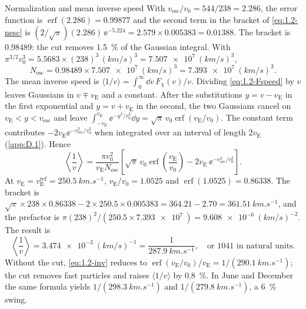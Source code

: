 \begin{workedexample}{Normalization and mean inverse speed}\label{we:1-nesc}
With $v_{\mathrm{esc}}/v_0 = 544/238 = 2.286$, the error function is $\operatorname{erf}(2.286) = 0.99877$ and the second term in the bracket of \cref{eq:1.2-nesc} is $(2/\sqrt{\pi})(2.286)\,\ee^{-5.224} = 2.579 \times 0.005383 = 0.01388$. The bracket is $0.98489$: the cut removes \SI{1.5}{\percent} of the Gaussian integral. With $\pi^{3/2} v_0^3 = 5.5683 \times (238)^3\,\si{(km/s)^3} = \SI{7.507e7}{(km/s)^3}$,
\begin{equation*}
  N_{\mathrm{esc}} = 0.98489 \times \SI{7.507e7}{(km/s)^3} = \SI{7.393e7}{(km/s)^3}.
\end{equation*}
The mean inverse speed is $\langle 1/v\rangle = \int_0^\infty \dd v\, F_\chi(v)/v$. Dividing \cref{eq:1.2-Fspeed} by $v$ leaves Gaussians in $v \mp v_{\mathrm{E}}$ and a constant. After the substitutions $y = v - v_{\mathrm{E}}$ in the first exponential and $y = v + v_{\mathrm{E}}$ in the second, the two Gaussians cancel on $v_{\mathrm{E}} < y < v_{\mathrm{esc}}$ and leave $\int_{-v_{\mathrm{E}}}^{v_{\mathrm{E}}} \ee^{-y^2/v_0^2}\dd y = \sqrt{\pi}\, v_0 \operatorname{erf}(v_{\mathrm{E}}/v_0)$. The constant term contributes $-2 v_{\mathrm{E}} \ee^{-v_{\mathrm{esc}}^2/v_0^2}$ when integrated over an interval of length $2v_{\mathrm{E}}$ (\cref{app:D.1}). Hence
\begin{equation}
  \left\langle \frac{1}{v} \right\rangle = \frac{\pi v_0^2}{v_{\mathrm{E}} N_{\mathrm{esc}}} \left[\sqrt{\pi}\, v_0 \operatorname{erf}\!\left(\frac{v_{\mathrm{E}}}{v_0}\right) - 2 v_{\mathrm{E}}\, \ee^{-v_{\mathrm{esc}}^2/v_0^2}\right].
  \label{eq:1.2-inv}
\end{equation}
At $v_{\mathrm{E}} = v_{\mathrm{E}}^{\mathrm{ref}} = \SI{250.5}{km.s^{-1}}$, $v_{\mathrm{E}}/v_0 = 1.0525$ and $\operatorname{erf}(1.0525) = 0.86338$. The bracket is $\sqrt{\pi} \times 238 \times 0.86338 - 2 \times 250.5 \times 0.005383 = 364.21 - 2.70 = \SI{361.51}{km.s^{-1}}$, and the prefactor is $\pi (238)^2/(250.5 \times \SI{7.393e7}{}) = \SI{9.608e-6}{(km/s)^{-2}}$. The result is
\begin{equation*}
  \left\langle \frac{1}{v} \right\rangle = \SI{3.474e-3}{(km/s)^{-1}} = \frac{1}{\SI{287.9}{km.s^{-1}}}, \quad\text{or } 1041 \text{ in natural units}.
\end{equation*} Without the cut, \cref{eq:1.2-inv} reduces to $\operatorname{erf}(v_{\mathrm{E}}/v_0)/v_{\mathrm{E}} = 1/(\SI{290.1}{km.s^{-1}})$; the cut removes fast particles and raises $\langle 1/v\rangle$ by \SI{0.8}{\percent}. In June and December the same formula yields $1/(\SI{298.3}{km.s^{-1}})$ and $1/(\SI{279.8}{km.s^{-1}})$, a \SI{6}{\percent} swing.
\end{workedexample}

